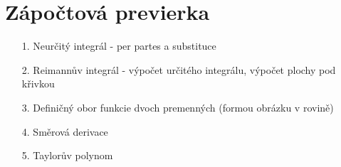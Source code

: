 \section{Zápočtová previerka}

\begin{enumerate}
    \item [1.] Neurčitý integrál - per partes a substituce
    \item [2.] Reimannův integrál - výpočet určitého integrálu, výpočet plochy pod křivkou
    \item [3.] Definičný obor funkcie dvoch premenných (formou obrázku v rovině)
    \item [4.] Směrová derivace
    \item [5.] Taylorův polynom
\end{enumerate}
